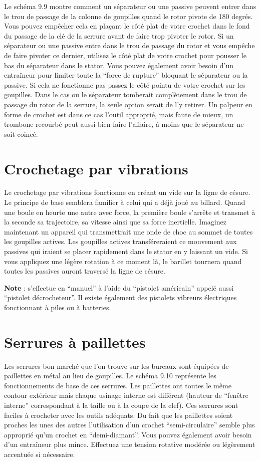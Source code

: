 \documentclass[a4paper,french,11pt,twoside]{report}
\begin{document}
Le schéma 9.9 montre comment un séparateur ou une passive peuvent entrer dans le trou de passage de la colonne de goupilles quand le rotor pivote de 180 degrés. Vous pouvez empêcher cela en plaçant le côté plat de votre crochet dans le fond du passage de la clé de la serrure avant de faire trop pivoter le rotor. Si un séparateur ou une passive entre dans le trou de passage du rotor et vous empêche de faire pivoter ce dernier, utilisez le côté plat de votre crochet pour pousser le bas du séparateur dans le stator. Vous pouvez également avoir besoin d'un entraîneur pour limiter toute la \enquote{force de rupture} bloquant le séparateur ou la passive. Si cela ne fonctionne pas passez le côté pointu de votre crochet sur les goupilles. Dans le cas ou le séparateur tomberait complètement dans le trou de passage du rotor de la serrure, la seule option serait de l'y retirer. Un palpeur en forme de crochet est dans ce cas l'outil approprié, mais faute de mieux, un trombone recourbé peut aussi bien faire l'affaire, à moins que le séparateur ne soit coincé.

\section{Crochetage par vibrations}
Le crochetage par vibrations fonctionne en créant un vide sur la ligne de césure. Le principe de base semblera familier à celui qui a déjà joué au billard. Quand une boule en heurte une autre avec force, la première boule s'arrête et transmet à la seconde sa trajectoire, sa vitesse ainsi que sa force inertielle. Imaginez maintenant un appareil qui transmettrait une onde de choc au sommet de toutes les goupilles actives. Les goupilles actives transféreraient ce mouvement aux passives qui iraient se placer rapidement dans le stator en y laissant un vide. Si vous appliquez une légère rotation à ce moment là, le barillet tournera quand toutes les passives auront traversé la ligne de césure.

\noindent \textbf{Note} : s'effectue en \enquote{manuel} à l'aide du \enquote{pistolet américain} appelé aussi \enquote{pistolet décrocheteur}. Il existe également des pistolets vibreurs électriques fonctionnant à piles ou à batteries.

\section{Serrures à paillettes}

Les serrures bon marché que l'on trouve sur les bureaux sont équipées de paillettes en métal au lieu de goupilles. Le schéma 9.10 représente les fonctionnements de base de ces serrures. Les paillettes ont toutes le même contour extérieur mais chaque usinage interne est différent (hauteur de \enquote{fenêtre  interne} correspondant à la taille ou à la coupe de la clef). Ces serrures sont faciles à crocheter avec les outils adéquats. Du fait que les paillettes soient proches les unes des autres l'utilisation d'un crochet \enquote{semi-circulaire} semble plus approprié qu'un crochet en \enquote{demi-diamant}. Vous pouvez également avoir besoin d'un entraîneur plus mince. Effectuez une tension rotative modérée ou légèrement accentuée si nécessaire.
\end{document}
